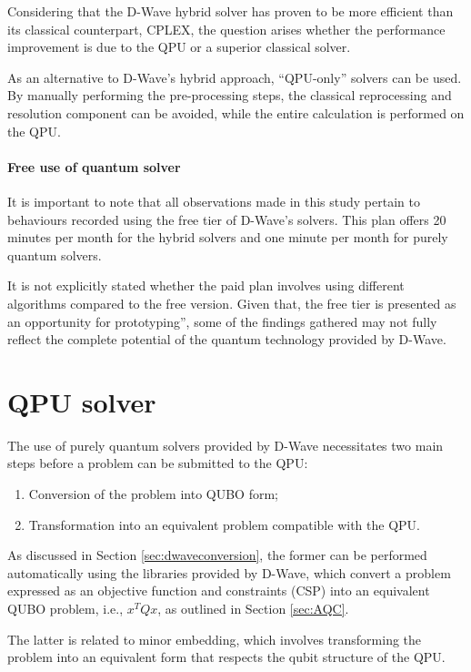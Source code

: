 Considering that the D-Wave hybrid solver has proven to be more efficient than its classical counterpart, CPLEX, the question arises whether the performance improvement is due to the QPU or a superior classical solver.

As an alternative to D-Wave's hybrid approach, ``QPU-only'' solvers can be used. By manually performing the pre-processing steps, the classical reprocessing and resolution component can be avoided, while the entire calculation is performed on the QPU.

\paragraph{Free use of quantum solver} It is important to note that all observations made in this study pertain to behaviours recorded using the free tier of D-Wave's solvers. 
This plan offers 20 minutes per month for the hybrid solvers and one minute per month for purely quantum solvers.

It is not explicitly stated whether the paid plan involves using different algorithms compared to the free version. 
Given that, the free tier is presented as an opportunity for prototyping'', some of the findings gathered may not fully reflect the complete potential of the quantum technology provided by D-Wave.

\section{QPU solver}

The use of purely quantum solvers provided by D-Wave necessitates two main steps before a problem can be submitted to the QPU:

\begin{enumerate}
    \item Conversion of the problem into QUBO form;
    \item Transformation into an equivalent problem compatible with the QPU.
\end{enumerate}

As discussed in Section \ref{sec:dwaveconversion}, the former can be performed automatically using the libraries provided by D-Wave, which convert a problem expressed as an objective function and constraints (CSP) into an equivalent QUBO problem, i.e., $x^TQx$, as outlined in Section \ref{sec:AQC}.

The latter is related to minor embedding, which involves transforming the problem into an equivalent form that respects the qubit structure of the QPU.

